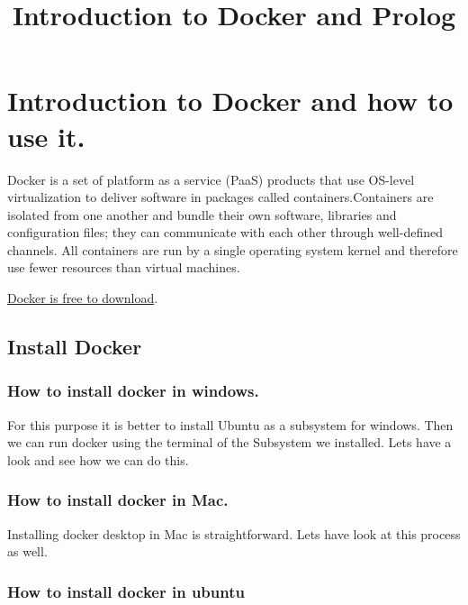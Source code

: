 \documentclass[11pt]{article}
\title{Introduction to Docker and Prolog}
\begin{document}
    
    \maketitle
    
    

    
    \hypertarget{introduction-to-docker-and-how-to-use-it.}{%
\section{Introduction to Docker and how to use
it.}\label{introduction-to-docker-and-how-to-use-it.}}

Docker is a set of platform as a service (PaaS) products that use
OS-level virtualization to deliver software in packages called
containers.Containers are isolated from one another and bundle their own
software, libraries and configuration files; they can communicate with
each other through well-defined channels. All containers are run by a
single operating system kernel and therefore use fewer resources than
virtual machines.

\href{https://www.docker.com/}{Docker is free to download}.

\hypertarget{install-docker}{%
\subsection{Install Docker}\label{install-docker}}

\hypertarget{how-to-install-docker-in-windows.}{%
\subsubsection{How to install docker in
windows.}\label{how-to-install-docker-in-windows.}}

For this purpose it is better to install Ubuntu as a subsystem for
windows. Then we can run docker using the terminal of the Subsystem we
installed. Lets have a look and see how we can do this.

\hypertarget{how-to-install-docker-in-mac.}{%
\subsubsection{How to install docker in
Mac.}\label{how-to-install-docker-in-mac.}}

Installing docker desktop in Mac is straightforward. Lets have look at
this process as well.

\hypertarget{how-to-install-docker-in-ubuntu}{%
\subsubsection{How to install docker in
ubuntu}\label{how-to-install-docker-in-ubuntu}}
\end{document}
